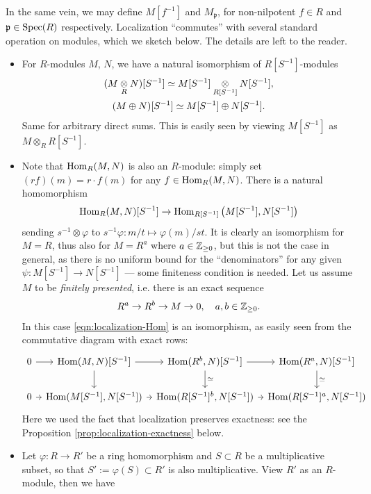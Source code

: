 In the same vein, we may define $M[f^{-1}]$ and $M_{\mathfrak{p}}$, for non-nilpotent $f \in R$ and $\mathfrak{p} \in \operatorname{Spec}(R)$ respectively. Localization ``commutes'' with several standard operation on modules, which we sketch below. The details are left to the reader.
\begin{itemize}
	\item For $R$-modules $M$, $N$, we have a natural isomorphism of $R[S^{-1}]$-modules
		\begin{gather*}
			(M \underset{R}{\otimes} N)[S^{-1}] \simeq M[S^{-1}] \underset{R[S^{-1}]}{\otimes} N[S^{-1}], \\
			(M \oplus N)[S^{-1}] \simeq M[S^{-1}] \oplus N[S^{-1}].
		\end{gather*}
		Same for arbitrary direct sums. This is easily seen by viewing $M[S^{-1}]$ as $M \otimes_R R[S^{-1}]$.
	\item Note that $\operatorname{Hom}_R(M, N)$ is also an $R$-module: simply set $(rf)(m) = r \cdot f(m)$ for any $f \in \operatorname{Hom}_R(M, N)$. There is a natural homomorphism
		\begin{gather}\label{eqn:localization-Hom}
			\operatorname{Hom}_R(M, N)[S^{-1}] \to \operatorname{Hom}_{R[S^{-1}]} \left( M[S^{-1}], N[S^{-1}] \right)
		\end{gather}
		sending $s^{-1} \otimes \varphi$ to $s^{-1}\varphi: m/t \mapsto \varphi(m)/st$. It is clearly an isomorphism for $M = R$, thus also for $M = R^a$ where $a \in \mathbb{Z}_{\geq 0}$, but this is not the case in general, as there is no uniform bound for the ``denominators'' for any given $\psi: M[S^{-1}] \to N[S^{-1}]$ --- some finiteness condition is needed. Let us assume $M$ to be \emph{finitely presented}, i.e. there is an exact sequence
		\[ R^a \to R^b \to M \to 0, \quad a,b \in \mathbb{Z}_{\geq 0}. \]
		In this case \eqref{eqn:localization-Hom} is an isomorphism, as easily seen from the commutative diagram with exact rows:
		\[ \begin{tikzcd}[column sep=tiny]
			0 \arrow[r] & \Hom(M,N)[S^{-1}] \arrow[r] \arrow[d] & \Hom(R^b, N)[S^{-1}] \arrow[r] \arrow[d, "\simeq"] & \Hom(R^a, N)[S^{-1}] \arrow[d, "\simeq"] \\
			0 \arrow[r] & \Hom(M[S^{-1}], N[S^{-1}]) \arrow[r] & \Hom(R[S^{-1}]^b, N[S^{-1}]) \arrow[r] & \Hom(R[S^{-1}]^a, N[S^{-1}])
		\end{tikzcd}\]
		Here we used the fact that localization preserves exactness: see the Proposition \ref{prop:localization-exactness} below.
	\item Let $\varphi: R \to R'$ be a ring homomorphism and $S \subset R$ be a multiplicative subset, so that $S' := \varphi(S) \subset R'$ is also multiplicative. View $R'$ as an $R$-module, then we have

\end{itemize}
